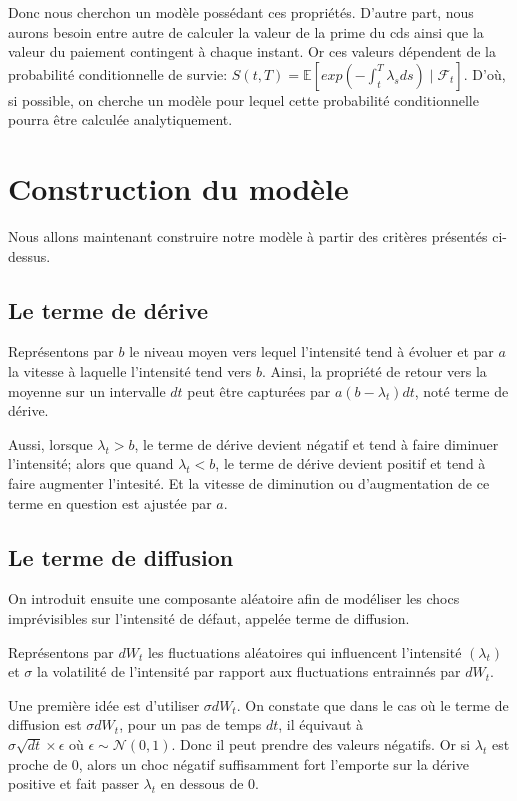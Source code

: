 Donc nous cherchon un modèle possédant ces propriétés. D'autre part, nous aurons besoin entre autre de calculer la valeur de la prime du \gls{cds} ainsi que la valeur du paiement contingent à chaque instant. Or ces valeurs dépendent de la probabilité conditionnelle de survie: $S(t, T) = \mathbb{E}[exp(-\int_t^T \lambda_s ds) \mid \mathcal{F}_t]$. D'où, si possible, on cherche un modèle pour lequel cette probabilité conditionnelle pourra être calculée analytiquement.

\section{Construction du modèle}

Nous allons maintenant construire notre modèle à partir des critères présentés ci-dessus.


\subsection{Le terme de dérive}

Représentons par $b$ le niveau moyen vers lequel l'intensité tend à évoluer et par $a$ la vitesse à laquelle l'intensité tend vers $b$. Ainsi, la propriété de retour vers la moyenne sur un intervalle $dt$ peut être capturées par $a(b - \lambda_t)dt$, noté terme de dérive.

Aussi, lorsque $\lambda_t > b$, le terme de dérive devient négatif et tend à faire diminuer l'intensité; alors que quand $\lambda_t < b$, le terme de dérive devient positif et tend à faire augmenter l'intesité. Et la vitesse de diminution ou d'augmentation de ce terme en question est ajustée par $a$.


\subsection{Le terme de diffusion}

On introduit ensuite une composante aléatoire afin de modéliser les chocs imprévisibles sur l’intensité de défaut, appelée terme de diffusion.

Représentons par $dW_t$ les fluctuations aléatoires qui influencent l'intensité $(\lambda_t)$ et $\sigma$ la volatilité de l'intensité par rapport aux fluctuations entrainnés par $dW_t$. 

Une première idée est d'utiliser $\sigma dW_t$. On constate que dans le cas où le terme de diffusion est $\sigma dW_t$, pour un pas de temps $dt$, il équivaut à $\sigma \sqrt{dt} \times \epsilon \text{ où } \epsilon \sim \mathcal{N}(0, 1)$. Donc il peut prendre des valeurs négatifs. Or si $\lambda_t$ est proche de 0, alors un choc négatif suffisamment fort l'emporte sur la dérive positive et fait passer $\lambda_t$ en dessous de 0.

